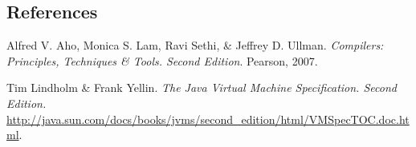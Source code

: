 \documentclass[11pt]{article}
\begin{document}
\subsection*{References}
Alfred V. Aho, Monica S. Lam, Ravi Sethi, \& Jeffrey D. Ullman.
\textit{Compilers: Principles, Techniques \& Tools. Second Edition}.
Pearson, 2007.

Tim Lindholm \& Frank Yellin. \textit{The Java Virtual Machine
Specification.  Second Edition.} 
\url{http://java.sun.com/docs/books/jvms/second_edition/html/VMSpecTOC.doc.html}.
\end{document}
